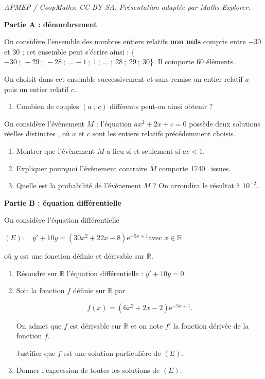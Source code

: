 \documentclass[10pt]{article}
\providecommand{\R}{\mathbb{R}}
\providecommand{\e}{{\mathrm{e}}}
\providecommand{\np}[2][]{{#2~#1}}
\begin{document}
\noindent\textit{APMEP / CoopMaths. CC BY-SA. Présentation adaptée par Maths Explorer.}\par\medskip
\medskip

\textbf{Partie A : dénombrement}

On considère l'ensemble des nombres entiers relatifs \textbf{non nuls} compris entre $- 30$ et $30$ ; cet ensemble peut s'écrire ainsi : \{$- 30~;~- 29~;~- 28~;~ ... - 1~;~1~;~ ... ~;~ 28~;~29~;~30$\}. Il comporte 60 éléments.

On choisit dans cet ensemble successivement et sans remise un entier relatif $a$ puis un entier relatif $c$.

\medskip

\begin{enumerate}
\item Combien de couples $(a~;~ c)$ différents peut-on ainsi obtenir ?
\end{enumerate}

On considère l'évènement $M$ : \og l'équation $ax^2 + 2x + c = 0$ possède deux solutions réelles distinctes \fg, où $a$ et $c$ sont les entiers relatifs précédemment choisis.

\begin{enumerate}[resume]
\item Montrer que l'évènement $M$ a lieu si et seulement si $ac < 1$.
\item Expliquer pourquoi l'évènement contraire $\overline{M}$ comporte \np{1740} issues.
\item Quelle est la probabilité de l'évènement $M$ ? On arrondira le résultat à $10^{-2}$.
\end{enumerate}

\medskip

\textbf{Partie B : équation différentielle}

\medskip

On considère l'équation différentielle 

\begin{center}$(E) :\quad  y' + 10y = \left(30x^2 + 22x - 8\right)\e^{-5x+1}$\quad avec \quad $x \in \R$\end{center}

où $y$ est une fonction définie et dérivable sur $\R$.

\medskip

\begin{enumerate}
\item Résoudre sur $\R$ l'équation différentielle : $y' + 10y = 0$.
\item Soit la fonction $f$ définie sur $\R$ par 

\[f(x) = (6x^2 + 2x - 2)\e^{-5x+ 1}.\]

On admet que $f$ est dérivable sur $\R$ et on note $f'$ la fonction dérivée de la fonction $f$.

Justifier que $f$ est une solution particulière de $(E)$.
\item Donner l'expression de toutes les solutions de $(E)$.
\end{enumerate}
\end{document}

